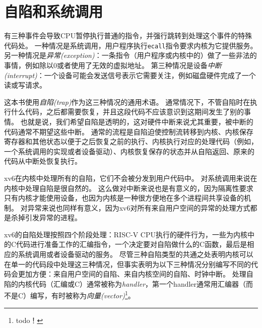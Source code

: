 \chapter{自陷和系统调用}\label{ch04}

有三种事件会导致CPU暂停执行普通的指令，并强行跳转到处理这个事件的特殊代码处。
一种情况是系统调用，用户程序执行\texttt{ecall}指令要求内核为它提供服务。
另一种情况是\emph{异常(exception)}：一条指令（用户程序或内核中的）做了一些非法的事情，例如除以0或者使用了无效的虚拟地址。
第三种情况是设备\emph{中断(interrupt)}：一个设备可能会发送信号表示它需要关注，例如磁盘硬件完成了一个读或写请求。

这本书使用\emph{自陷(trap)}作为这三种情况的通用术语。
通常情况下，不管自陷时在执行什么代码，之后都需要恢复，并且这段代码不应该意识到这期间发生了别的事情。
也就是说，我们希望自陷是透明的，这对硬件中断来说尤其重要，被中断的代码通常不期望这些中断。
通常的流程是自陷迫使控制流转移到内核、内核保存寄存器和其他状态以便于之后恢复之前的执行、内核执行对应的处理代码（例如，一个系统调用的实现或者设备驱动）、内核恢复保存的状态并从自陷返回、原来的代码从中断处恢复执行。

xv6在内核中处理所有的自陷，它们不会被分发到用户代码中。
对系统调用来说在内核中处理自陷是很自然的。
这么做对中断来说也是有意义的，因为隔离性要求只有内核才能使用设备，也因为内核是一种很方便地在多个进程间共享设备的机制。
对异常来说也同样有意义，因为xv6对所有来自用户空间的异常的处理方式都是杀掉引发异常的进程。

xv6的自陷处理按照四个阶段处理：RISC-V CPU执行的硬件行为，一些为内核中的C代码进行准备工作的汇编指令，一个决定要对自陷做什么的C函数，最后是相应的系统调用或者设备驱动的服务。
尽管三种自陷类型的共通之处表明内核可以在单一的代码段中处理这三种情况，但事实表明为以下三种情况分别编写不同的代码会更加方便：来自用户空间的自陷、来自内核空间的自陷、时钟中断。
处理自陷的内核代码（汇编或C）通常被称为\emph{handler}，第一个handler通常用汇编器（而不是C）编写，有时被称为\emph{向量(vector)}\footnote{todo！}。

